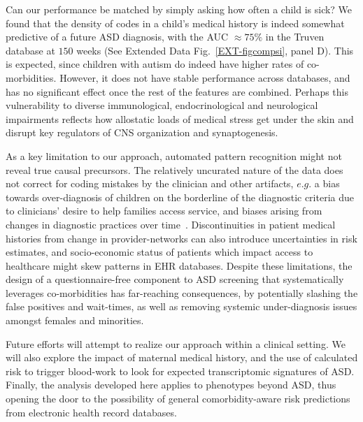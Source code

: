 \documentclass[onecolumn,,10pt]{IEEEtran}
\begin{document}
 Can our performance be matched by simply asking how often a child is sick? We  found that the density of  codes in a child's medical history is indeed somewhat  predictive of a future ASD diagnosis, with the AUC  $\approx 75\%$ in the Truven database at $150$ weeks (See Extended Data Fig.~\ref{EXT-figcompsi}, panel D). This is expected, since children with autism do indeed have higher rates of co-morbidities. However, it does not have stable  performance across databases, and has no significant effect once the rest of the features are combined. Perhaps this vulnerability to diverse immunological, endocrinological and neurological impairments reflects how allostatic loads of medical stress get under the skin and disrupt key regulators of CNS organization and synaptogenesis. 
 
 As a key limitation to our approach, automated pattern recognition  might not reveal true causal precursors.
The relatively uncurated nature of the  data does not correct for coding mistakes by the clinician and other artifacts, $e.g.$   a bias towards over-diagnosis of  children on the borderline of the diagnostic criteria due to clinicians' desire to help families access service, and biases arising from changes in diagnostic practices over time~\cite{10.1001/jamapsychiatry.2019.1956}. Discontinuities in patient medical histories from change in provider-networks  can also introduce  uncertainties  in risk estimates, and socio-economic status of patients which impact access to healthcare  might skew patterns in EHR databases.
Despite these limitations, the design of a questionnaire-free component to ASD screening  that systematically leverages co-morbidities  has far-reaching consequences, by potentially slashing the false positives and wait-times, as well as removing systemic under-diagnosis issues amongst females and minorities. 

 Future efforts will attempt to realize our approach within a clinical setting. We will also explore the impact of  maternal medical history, and the  use of calculated risk to trigger   blood-work to look for expected  transcriptomic  signatures of ASD. Finally,  the analysis developed here applies to phenotypes beyond ASD, thus opening the door to the possibility of  general  comorbidity-aware risk predictions  from electronic health record databases.
 


\def\MXCOL{black}
\def\FXCOL{Orchid3}
\def\MNCOL{SeaGreen4}
\def\FNCOL{SeaGreen4}
\def\NCOL{SeaGreen4}
\def\XCOL{Tomato}
\def\WCOL{Tomato}
\def\YCOL{DodgerBlue4}
\def\TEXTCOL{gray}
\def\AXISCOL{white}
\end{document}
